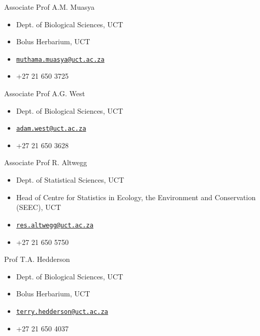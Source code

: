 \documentclass[]{article}
\providecommand{\tightlist}{%
  \setlength{\itemsep}{0pt}\setlength{\parskip}{0pt}}
\begin{document}
Associate Prof A.M. Muasya

\begin{itemize}
\tightlist
\item
  Dept. of Biological Sciences, UCT
\item
  Bolus Herbarium, UCT
\item
  \href{mailto:muthama.muasya@uct.ac.za}{\nolinkurl{muthama.muasya@uct.ac.za}}
\item
  +27 21 650 3725
\end{itemize}

Associate Prof A.G. West

\begin{itemize}
\tightlist
\item
  Dept. of Biological Sciences, UCT
\item
  \href{mailto:adam.west@uct.ac.za}{\nolinkurl{adam.west@uct.ac.za}}
\item
  +27 21 650 3628
\end{itemize}

Associate Prof R. Altwegg

\begin{itemize}
\tightlist
\item
  Dept. of Statistical Sciences, UCT
\item
  Head of Centre for Statistics in Ecology, the Environment and
  Conservation (SEEC), UCT
\item
  \href{mailto:res.altwegg@uct.ac.za}{\nolinkurl{res.altwegg@uct.ac.za}}
\item
  +27 21 650 5750
\end{itemize}

Prof T.A. Hedderson

\begin{itemize}
\tightlist
\item
  Dept. of Biological Sciences, UCT
\item
  Bolus Herbarium, UCT
\item
  \href{mailto:terry.hedderson@uct.ac.za}{\nolinkurl{terry.hedderson@uct.ac.za}}
\item
  +27 21 650 4037
\end{itemize}
\end{document}
